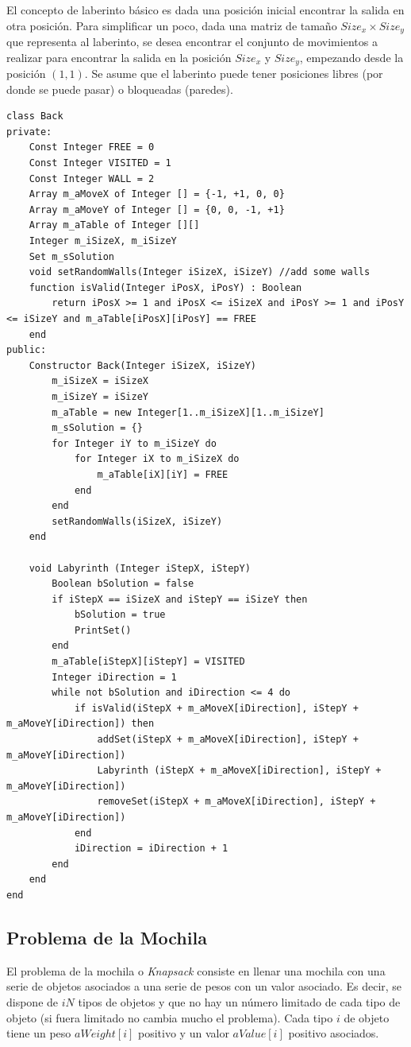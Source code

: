 El concepto de laberinto básico es dada una posición inicial encontrar la salida en otra posición. Para simplificar un poco, dada una matriz de tamaño $Size_x \times Size_y$ que representa al laberinto, se desea encontrar el conjunto de movimientos a realizar para encontrar la salida en la posición $Size_x$ y $Size_y$, empezando desde la posición $(1,1)$. Se asume que el laberinto puede tener posiciones libres (por donde se puede pasar) o bloqueadas (paredes).

\begin{lstlisting}[upquote=true, language=pseudo]
class Back
private:
	Const Integer FREE = 0
	Const Integer VISITED = 1
	Const Integer WALL = 2
	Array m_aMoveX of Integer [] = {-1, +1, 0, 0}
	Array m_aMoveY of Integer [] = {0, 0, -1, +1}
	Array m_aTable of Integer [][]
	Integer m_iSizeX, m_iSizeY
	Set m_sSolution
	void setRandomWalls(Integer iSizeX, iSizeY)	//add some walls
	function isValid(Integer iPosX, iPosY) : Boolean
		return iPosX >= 1 and iPosX <= iSizeX and iPosY >= 1 and iPosY <= iSizeY and m_aTable[iPosX][iPosY] == FREE
	end
public:
	Constructor Back(Integer iSizeX, iSizeY)
		m_iSizeX = iSizeX
		m_iSizeY = iSizeY
		m_aTable = new Integer[1..m_iSizeX][1..m_iSizeY]
		m_sSolution = {}
		for Integer iY to m_iSizeY do
			for Integer iX to m_iSizeX do
				m_aTable[iX][iY] = FREE
			end
		end
		setRandomWalls(iSizeX, iSizeY)
	end

	void Labyrinth (Integer iStepX, iStepY)
		Boolean bSolution = false
		if iStepX == iSizeX and iStepY == iSizeY then
			bSolution = true
			PrintSet()
		end
		m_aTable[iStepX][iStepY] = VISITED
		Integer iDirection = 1
		while not bSolution and iDirection <= 4 do
			if isValid(iStepX + m_aMoveX[iDirection], iStepY + m_aMoveY[iDirection]) then
				addSet(iStepX + m_aMoveX[iDirection], iStepY + m_aMoveY[iDirection])
				Labyrinth (iStepX + m_aMoveX[iDirection], iStepY + m_aMoveY[iDirection])
				removeSet(iStepX + m_aMoveX[iDirection], iStepY + m_aMoveY[iDirection])
			end
			iDirection = iDirection + 1
		end
	end
end
\end{lstlisting}



\subsection{Problema de la Mochila}

El problema de la mochila o \textit{Knapsack} consiste en llenar una mochila con una serie de objetos asociados a una serie de pesos con un valor asociado. Es decir, se dispone de $iN$ tipos de objetos y que no hay un número limitado de cada tipo de objeto (si fuera limitado no cambia mucho el problema). Cada tipo $i$ de objeto tiene un peso $aWeight[i]$ positivo y un valor $aValue[i]$ positivo asociados. 

